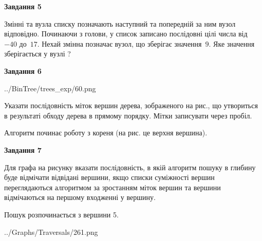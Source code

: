 \documentclass[12pt, ukrainian]{article}
\begin{document}
{\begin {large}
{\begin {center}\textbf{Завдання 5}\end {center}}\par
Змінні  та  вузла списку позначають наступний та попередній за ним вузол відповідно. Починаючи з голови, у список записано послідовні цілі числа від~$-40$ до~$17$. Нехай змінна  позначає вузол, що зберігає значення~$9$.
Яке значення зберігається у вузлі  ?\par
\newpage

{\begin {center}\textbf{Завдання 6}\end {center}}\par

\begin{center}
	{../BinTree/trees_exp/60.png}
\end{center}
Указати послідовність міток вершин дерева, зображеного на рис., що утвориться в результаті обходу дерева в прямому порядку. Мітки записувати через пробіл.\par Алгоритм починає роботу з кореня (на рис. це верхня вершина).\par
\newpage

{\begin {center}\textbf{Завдання 7}\end {center}}\par
Для графа на рисунку вказати послідовність, в якій алгоритм пошуку в глибину буде відмічати відвідані вершини, якщо списки суміжності вершин переглядаються алгоритмом за зростанням міток вершин та вершини відмічаються на першому вход\-женні у вершину.\par
Пошук розпочинається з вершини 5.\par

\begin{center}
	{../Graphs/Traversals/261.png}
\end{center}\par
\newpage


\end{large}}
\end{document}
